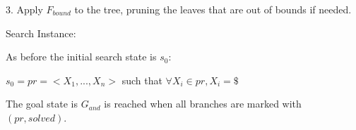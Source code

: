 \documentclass[10pt]{article}
\begin{document}
3. Apply $F_{bound}$ to the tree, pruning the leaves that are out of bounds if needed.

\bigskip
\bigskip
\bigskip
\bigskip
 
Search Instance:

As before the initial search state is $s_0$:

\bigskip

$s_0 = pr = <X_1, ..., X_n> $ such that $\forall X_i \in pr, X_i = \$ $ 

\bigskip

The goal state is $G_{and}$ is reached when all branches are marked with $(pr, solved)$.

\huge




 
\end{document}
